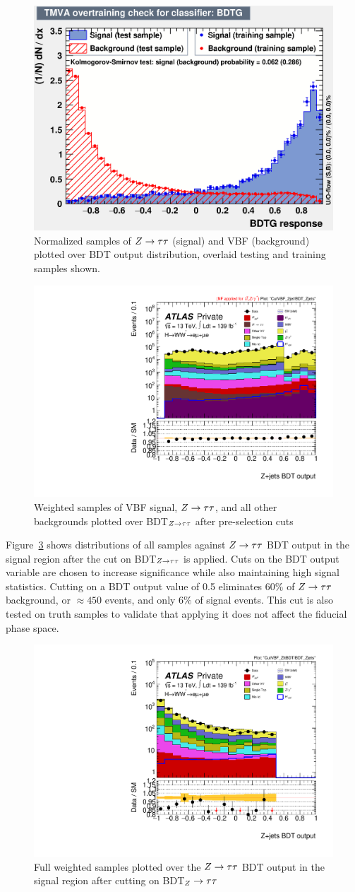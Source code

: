 \begin{figure}[!htbp]
 \centering
  \includegraphics[width=.45\linewidth]{Pictures/ZttBDT/overtrain_BDTG.eps}
\caption{Normalized samples of $Z\rightarrow\tau\tau$ (signal) and VBF (background) plotted over BDT output distribution, overlaid testing and training samples shown.}
\label{fig:ZjetsBDTresult}
\end{figure}
\begin{figure}
\centering
  \includegraphics[width=.6\linewidth]{Pictures/run2-emme-CutVBF_2jet-BDT_Zjets-log.pdf}
\caption{Weighted samples of VBF signal, $Z\rightarrow\tau\tau$, and all other backgrounds plotted over BDT$_{Z\rightarrow\tau\tau}$ after pre-selection cuts}
\label{fig:ZjetsBDTresult2}
\end{figure}

Figure~\ref{fig:ZjetsBDTinterpret} shows distributions of all samples against $Z\rightarrow\tau\tau$ BDT output in the signal region after the cut on BDT$_{Z\rightarrow\tau\tau}$ is applied. Cuts on the BDT output variable are chosen to increase significance while also maintaining high signal statistics. Cutting on a BDT output value of 0.5 eliminates $60\%$ of $Z\rightarrow\tau\tau$ background, or $\approx 450$ events, and only $6\%$ of signal events. This cut is also tested on truth samples to validate that applying it does not affect the fiducial phase space. 

\begin{figure}[!htbp]
\centering
\includegraphics[width=.6\linewidth]{Pictures/ZttBDT/run2-emme-CutVBF_ZttBDT-BDT_Zjets-log.pdf}
\caption{Full weighted samples plotted over the $Z\rightarrow\tau\tau$ BDT output in the signal region after cutting on BDT$_Z\rightarrow\tau\tau$}
\label{fig:ZjetsBDTinterpret}
\end{figure}

